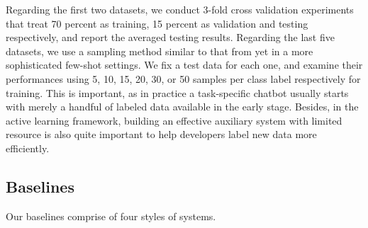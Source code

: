 Regarding  the first two datasets, we conduct 3-fold cross validation experiments that treat 70   percent   as  training,  15  percent  as  validation  and  testing respectively,  and  report  the  averaged  testing results. 
Regarding the last five datasets, we use a sampling method similar to that from \cite{casanueva2020efficient}   yet  in  a  more  sophisticated  few-shot settings.  
We  fix  a  test  data for each one, and examine their performances using  5,  10,  15,  20,  30,  or 50 samples per class label respectively for training.  
This  is important, as in practice a task-specific chatbot usually starts  with  merely  a  handful of labeled data available in the early stage.
Besides,  in  the  active  learning framework, building an effective auxiliary system  with limited resource is also quite important to help developers label new data more efficiently.

\subsection{Baselines}
Our baselines comprise of four styles of systems.  

